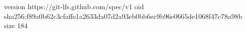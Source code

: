 version https://git-lfs.github.com/spec/v1
oid sha256:f89a0b62c3cfaffe1a2633da07d2a93eb0bb6ec9b96e0665de1068f47c78a98b
size 184
